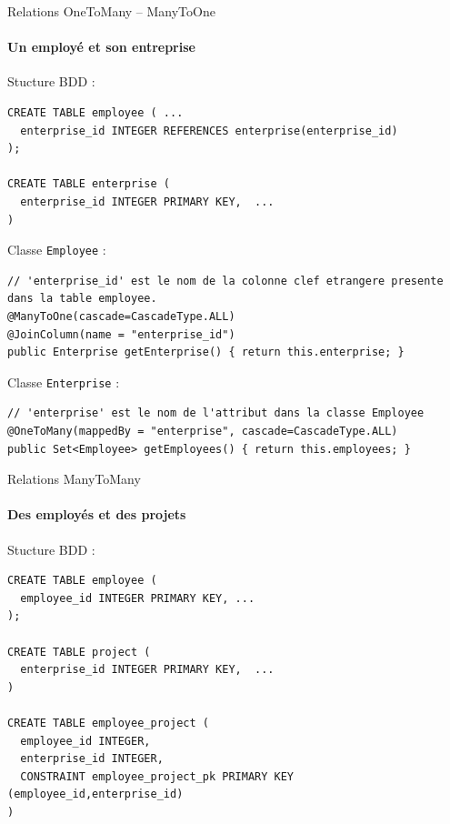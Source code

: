 \documentclass[compact]{beamer}%
\begin{document}
\begin{frame}[fragile]{Relations OneToMany -- ManyToOne}
	\framesubtitle{Un employé et son entreprise}
	
	Stucture BDD :	
	\begin{lstlisting}
CREATE TABLE employee ( ...
  enterprise_id INTEGER REFERENCES enterprise(enterprise_id)
);

CREATE TABLE enterprise (
  enterprise_id INTEGER PRIMARY KEY,  ...
)
	\end{lstlisting}
	
	\pause
	Classe \texttt{Employee} : 
	\begin{lstlisting}
// 'enterprise_id' est le nom de la colonne clef etrangere presente dans la table employee.
@ManyToOne(cascade=CascadeType.ALL)
@JoinColumn(name = "enterprise_id")
public Enterprise getEnterprise() { return this.enterprise; }
	\end{lstlisting}
	
	\pause
	Classe \texttt{Enterprise} :
	\begin{lstlisting}
// 'enterprise' est le nom de l'attribut dans la classe Employee
@OneToMany(mappedBy = "enterprise", cascade=CascadeType.ALL)
public Set<Employee> getEmployees() { return this.employees; }
	\end{lstlisting}

\end{frame}

\begin{frame}[containsverbatim]{Relations ManyToMany}
	\framesubtitle{Des employés et des projets}
	
	Stucture BDD :	
	\begin{lstlisting}
CREATE TABLE employee (
  employee_id INTEGER PRIMARY KEY, ...
);

CREATE TABLE project (
  enterprise_id INTEGER PRIMARY KEY,  ...
)

CREATE TABLE employee_project (
  employee_id INTEGER,
  enterprise_id INTEGER,
  CONSTRAINT employee_project_pk PRIMARY KEY (employee_id,enterprise_id)
)
	\end{lstlisting}
	

\end{frame}
\end{document}
